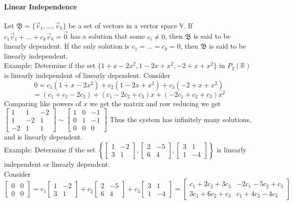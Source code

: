\documentclass[10pt,letter]{article}
\begin{document}
\paragraph{Linear Independence} Let $\mathfrak{B}=\{\vec{v}_1,\ldots,\vec{v}_k\}$ be a set of vectors in a vector space $\mathbb{V}$. If $c_1\vec{v}_1+\ldots+c_k\vec{v}_k=\vec{0}$ has a  solution that some $c_i\neq 0$, then $\mathfrak{B}$ is said to be linearly dependent. If the only solution is $c_1=\ldots=c_k=0$, then $\mathfrak{B}$ is said to be linearly independent. \\ 
Example: Determine if the set $\{1+x-2x^2,1-2x+x^2,-2+x+x^2\}$ in $P_2(\mathbb{R})$ is linearly independent of linearly dependent. Consider $$0=c_1(1+x-2x^2)+c_2(1-2x+x^2)+c_3(-2+x+x^2)$$ $$=(c_1+c_2-2c_3)+(c_1-2c_2+c_3)x+(-2c_1+c_2+c_3)x^2$$ Comparing like powers of $x$ we get the matrix and row reducing we get $\begin{bmatrix}1&1&-2\\1&-2&1\\-2&1&1\end{bmatrix}\sim \begin{bmatrix}1&0&-1\\0&1&-1\\0&0&0\end{bmatrix}$ Thus the system has infinitely many solutions, and is linearly dependent. \\ 
Example: Determine if the set $\left\{\begin{bmatrix}1&-2\\3&1\end{bmatrix},\begin{bmatrix}2&-5\\6&4\end{bmatrix},\begin{bmatrix}3&1\\1&-4\end{bmatrix}\right\}$ is linearly independent or linearly dependent. \\ 
Consider $$\begin{bmatrix}0&0\\0&0\end{bmatrix}=c_1\begin{bmatrix}1&-2\\3&1\end{bmatrix}+c_2\begin{bmatrix}2&-5\\6&4\end{bmatrix}+c_3\begin{bmatrix}3&1\\1&-4\end{bmatrix}=\begin{bmatrix}c_1+2c_2+3c_3&-2c_1-5c_2+c_3\\3c_1+6c_2+c_3&c_1+4c_2-4c_3\end{bmatrix}$$
\end{document}
